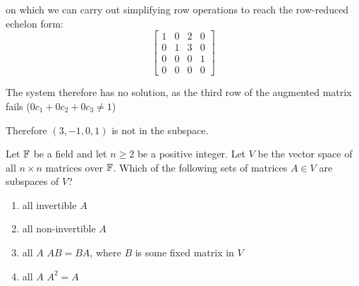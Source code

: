 \documentclass[a4paper, 11pt]{article}
\begin{document}
\begin{solution}
    on which we can carry out simplifying row operations to reach the row-reduced echelon form:
    \[
        \left[\begin{array}{cccc}
                1 & 0 & 2 & 0 \\
                0 & 1 & 3 & 0 \\
                0 & 0 & 0 & 1 \\
                0 & 0 & 0 & 0
            \end{array}\right]
    \]

    The system therefore has no solution, as the third row of the augmented matrix fails (\(0c_1 + 0c_2 + 0c_3 \neq 1\))

    Therefore \((3, -1, 0, 1)\) is not in the subspace.
\end{solution}

\begin{problem} 
Let \(\mathbb{F}\) be a field and let \(n \geq 2\) be a positive integer. Let \(V\) be the vector space of all \(n \times n\) matrices over \(\mathbb{F}\). Which of the following sets of matrices \(A \in V\) are subspaces of \(V\)?
\begin{enumerate}
    \item all invertible \(A\)
    \item all non-invertible \(A\)
    \item all \(A\) \st \(AB = BA\), where \(B\) is some fixed matrix in \(V\)
    \item all \(A\) \st \(A^2 = A\)
\end{enumerate}
\end{problem}
\end{document}
